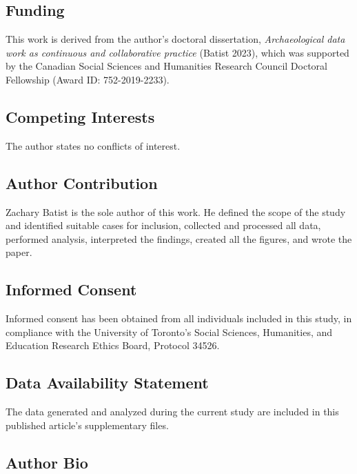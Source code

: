 \documentclass[
]{article}
\begin{document}
\subsection{Funding}\label{funding}

This work is derived from the author's doctoral dissertation,
\emph{Archaeological data work as continuous and collaborative practice}
(Batist 2023), which was supported by the Canadian Social Sciences and
Humanities Research Council Doctoral Fellowship (Award ID:
752-2019-2233).

\subsection{Competing Interests}\label{competing-interests}

The author states no conflicts of interest.

\subsection{Author Contribution}\label{author-contribution}

Zachary Batist is the sole author of this work. He defined the scope of
the study and identified suitable cases for inclusion, collected and
processed all data, performed analysis, interpreted the findings,
created all the figures, and wrote the paper.

\subsection{Informed Consent}\label{informed-consent}

Informed consent has been obtained from all individuals included in this
study, in compliance with the University of Toronto's Social Sciences,
Humanities, and Education Research Ethics Board, Protocol 34526.

\subsection{Data Availability
Statement}\label{data-availability-statement}

The data generated and analyzed during the current study are included in
this published article's supplementary files.

\subsection{Author Bio}\label{author-bio}
\end{document}
